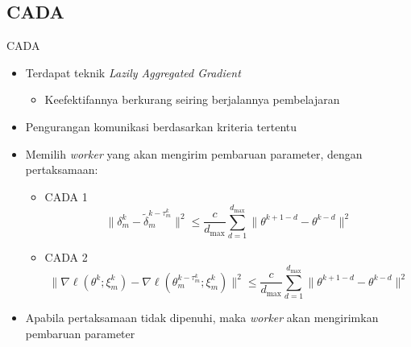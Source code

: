 \subsection{CADA}
\begin{frame}{CADA \parencite{Chen2021CADA}}
  \begin{itemize}
    \item Terdapat teknik \textit{Lazily Aggregated Gradient} \parencite{Chen2018LAG}
          \begin{itemize}
            \item Keefektifannya berkurang seiring berjalannya pembelajaran
          \end{itemize}
    \item Pengurangan komunikasi berdasarkan kriteria tertentu
    \item Memilih \textit{worker} yang akan mengirim pembaruan parameter, dengan pertaksamaan:
          \begin{itemize}
            \item CADA 1
                  \begin{equation*}
                    \| \delta_m^k - \tilde{\delta}_m^{k-\tau_m^k} \|^2 \le \frac{c}{d_{\mathrm{max}}}\sum_{d=1}^{d_{\mathrm{max}}}\| \theta^{k+1-d} - \theta^{k-d} \|^2
                  \end{equation*}
            \item CADA 2
                  \begin{equation*}
                    \| \nabla \ell (\theta^k; \xi_m^k) - \nabla \ell (\theta_m^{k-\tau_m^k}; \xi_m^k) \|^2 \le \frac{c}{d_{\mathrm{max}}} \sum_{d=1}^{d_{\mathrm{max}}} \| \theta^{k+1-d} - \theta^{k-d} \|^2
                  \end{equation*}
          \end{itemize}
    \item Apabila pertaksamaan tidak dipenuhi, maka \textit{worker} akan mengirimkan pembaruan parameter
  \end{itemize}
\end{frame}
